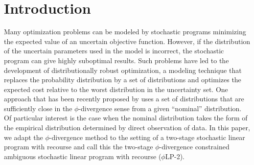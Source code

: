 \documentclass[opre,nonblindrev]{informs3} %
\newcommand{\plp}{$\phi$LP-2}
\begin{document}
%

\section{Introduction}

Many optimization problems can be modeled by stochastic programs minimizing the expected value of an uncertain objective function.
However, if the distribution of the uncertain parameters used in the model is incorrect, the stochastic program can give highly suboptimal results.
Such problems have led to the development of distributionally robust optimization, a modeling technique that replaces the probability distribution by a set of distributions and optimizes the expected cost relative to the worst distribution in the uncertainty set.
One approach that has been recently proposed by \citet{bental2013robust} uses a set of distributions that are sufficiently close in the $\phi$-divergence sense from a given ``nominal'' distribution. 
Of particular interest is the case when the nominal distribution takes the form of the empirical distribution determined by direct observation of data.
In this paper, we adapt the $\phi$-divergence method to the setting of a two-stage stochastic linear program with recourse and call this the two-stage $\phi$-divergence constrained ambiguous stochastic linear program with recourse (\plp).
\end{document}
